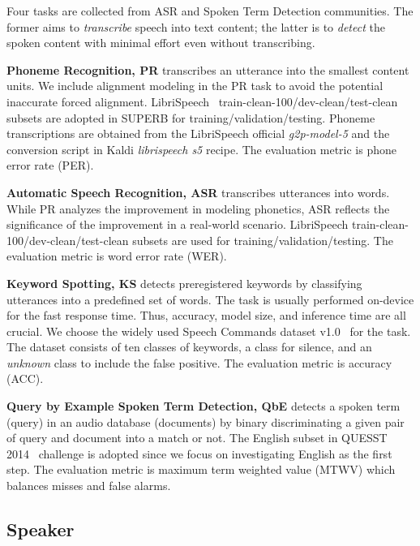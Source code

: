 \documentclass[a4paper]{article}
\begin{document}
Four tasks are collected from ASR and Spoken Term Detection communities.
The former aims to \textit{transcribe} speech into text content; the latter is to \textit{detect} the spoken content with minimal effort even without transcribing.

\textbf{Phoneme Recognition, PR} transcribes an utterance into the smallest content units.
We include alignment modeling in the PR task to avoid the potential inaccurate forced alignment.
LibriSpeech~\cite{librispeech} train-clean-100/dev-clean/test-clean subsets are adopted in SUPERB for training/validation/testing.
Phoneme transcriptions are obtained from the LibriSpeech official \textit{g2p-model-5} and the conversion script in Kaldi \textit{librispeech s5} recipe.
The evaluation metric is phone error rate (PER).

\textbf{Automatic Speech Recognition, ASR} transcribes utterances into words.
While PR analyzes the improvement in modeling phonetics, ASR reflects the significance of the improvement in a real-world scenario.
LibriSpeech train-clean-100/dev-clean/test-clean subsets are used for training/validation/testing.
The evaluation metric is word error rate (WER).

\textbf{Keyword Spotting, KS} detects preregistered keywords by classifying utterances into a predefined set of words.
The task is usually performed on-device for the fast response time.
Thus, accuracy, model size, and inference time are all crucial.
We choose the widely used Speech Commands dataset v1.0~\cite{speech_commands} for the task.
The dataset consists of ten classes of keywords, a class for silence, and an \textit{unknown} class to include the false positive.
The evaluation metric is accuracy (ACC).

\textbf{Query by Example Spoken Term Detection, QbE} detects a spoken term (query) in an audio database (documents) by binary discriminating a given pair of query and document into a match or not.
The English subset in QUESST 2014~\cite{quesst2014} challenge is adopted since we focus on investigating English as the first step.
The evaluation metric is maximum term weighted value (MTWV) which balances misses and false alarms.

\subsection{Speaker}
\end{document}

